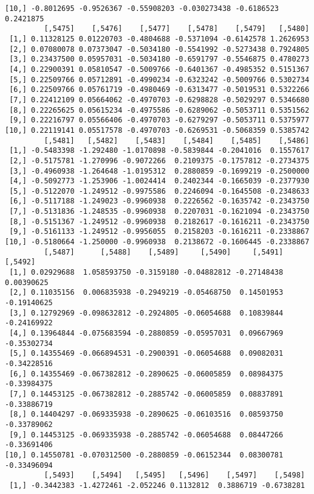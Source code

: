 \documentclass[
  letterpaper,
  DIV=11,
  numbers=noendperiod]{scrreprt}
\begin{document}
\begin{verbatim}
[10,] -0.8012695 -0.9526367 -0.55908203 -0.030273438 -0.6186523 0.2421875
         [,5475]    [,5476]    [,5477]    [,5478]    [,5479]   [,5480]
 [1,] 0.11328125 0.01220703 -0.4804688 -0.5371094 -0.6142578 1.2626953
 [2,] 0.07080078 0.07373047 -0.5034180 -0.5541992 -0.5273438 0.7924805
 [3,] 0.23437500 0.05957031 -0.5034180 -0.6591797 -0.5546875 0.4780273
 [4,] 0.22900391 0.05810547 -0.5009766 -0.6401367 -0.4985352 0.5151367
 [5,] 0.22509766 0.05712891 -0.4990234 -0.6323242 -0.5009766 0.5302734
 [6,] 0.22509766 0.05761719 -0.4980469 -0.6313477 -0.5019531 0.5322266
 [7,] 0.22412109 0.05664062 -0.4970703 -0.6298828 -0.5029297 0.5346680
 [8,] 0.22265625 0.05615234 -0.4975586 -0.6289062 -0.5053711 0.5351562
 [9,] 0.22216797 0.05566406 -0.4970703 -0.6279297 -0.5053711 0.5375977
[10,] 0.22119141 0.05517578 -0.4970703 -0.6269531 -0.5068359 0.5385742
         [,5481]   [,5482]    [,5483]    [,5484]    [,5485]    [,5486]
 [1,] -0.5483398 -1.292480 -1.0170898 -0.5839844 -0.2041016  0.1557617
 [2,] -0.5175781 -1.270996 -0.9072266  0.2109375 -0.1757812 -0.2734375
 [3,] -0.4960938 -1.264648 -1.0195312  0.2880859 -0.1699219 -0.2500000
 [4,] -0.5092773 -1.253906 -1.0024414  0.2402344 -0.1665039 -0.2377930
 [5,] -0.5122070 -1.249512 -0.9975586  0.2246094 -0.1645508 -0.2348633
 [6,] -0.5117188 -1.249023 -0.9960938  0.2226562 -0.1635742 -0.2343750
 [7,] -0.5131836 -1.248535 -0.9960938  0.2207031 -0.1621094 -0.2343750
 [8,] -0.5151367 -1.249512 -0.9960938  0.2182617 -0.1616211 -0.2343750
 [9,] -0.5161133 -1.249512 -0.9956055  0.2158203 -0.1616211 -0.2338867
[10,] -0.5180664 -1.250000 -0.9960938  0.2138672 -0.1606445 -0.2338867
         [,5487]      [,5488]    [,5489]     [,5490]     [,5491]     [,5492]
 [1,] 0.02929688  1.058593750 -0.3159180 -0.04882812 -0.27148438  0.00390625
 [2,] 0.11035156  0.006835938 -0.2949219 -0.05468750  0.14501953 -0.19140625
 [3,] 0.12792969 -0.098632812 -0.2924805 -0.06054688  0.10839844 -0.24169922
 [4,] 0.13964844 -0.075683594 -0.2880859 -0.05957031  0.09667969 -0.35302734
 [5,] 0.14355469 -0.066894531 -0.2900391 -0.06054688  0.09082031 -0.34228516
 [6,] 0.14355469 -0.067382812 -0.2890625 -0.06005859  0.08984375 -0.33984375
 [7,] 0.14453125 -0.067382812 -0.2885742 -0.06005859  0.08837891 -0.33886719
 [8,] 0.14404297 -0.069335938 -0.2890625 -0.06103516  0.08593750 -0.33789062
 [9,] 0.14453125 -0.069335938 -0.2885742 -0.06054688  0.08447266 -0.33691406
[10,] 0.14550781 -0.070312500 -0.2880859 -0.06152344  0.08300781 -0.33496094
         [,5493]    [,5494]   [,5495]   [,5496]    [,5497]    [,5498]
 [1,] -0.3442383 -1.4272461 -2.052246 0.1132812  0.3886719 -0.6738281

\end{verbatim}
\end{document}
